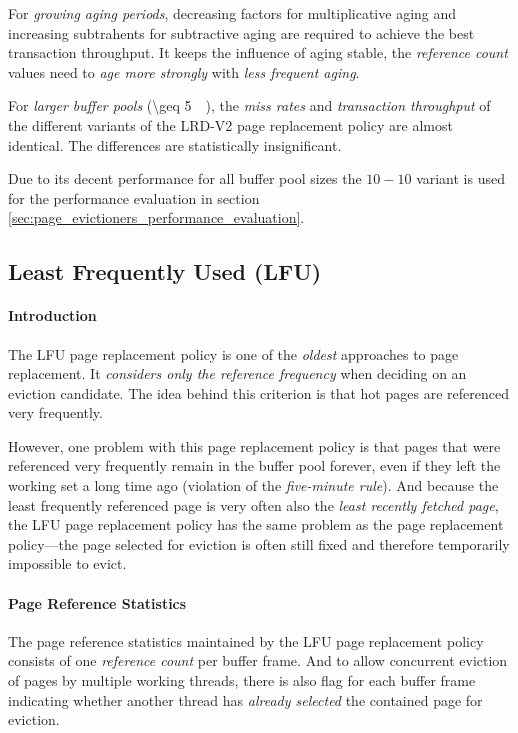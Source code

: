     For \emph{growing aging periods}, decreasing factors for multiplicative aging and increasing subtrahents for subtractive aging are required to achieve the best transaction throughput. It keeps the influence of aging stable, the \textit{reference count} values need to \emph{age more strongly} with \emph{less frequent aging}.

    For \emph{larger buffer pools} (\SI{\geq 5}{\giga\byte}), the \emph{miss rates} and \emph{transaction throughput} of the different variants of the LRD-V2 page replacement policy are almost identical. The differences are statistically insignificant.

    Due to its decent performance for all buffer pool sizes the $10 - 10$ variant is used for the performance evaluation in section \ref{sec:page_evictioners_performance_evaluation}.

\subsection[LFU]{Least Frequently Used (LFU)} \label{subsec:lfu}

\paragraph{Introduction}

    The LFU page replacement policy is one of the \emph{oldest} approaches to page replacement. It \emph{considers only the reference frequency} when deciding on an eviction candidate. The idea behind this criterion is that hot pages are referenced very frequently.

    However, one problem with this page replacement policy is that pages that were referenced very frequently remain in the buffer pool forever, even if they left the working set a long time ago (violation of the \emph{five-minute rule}). And because the least frequently referenced page is very often also the \emph{least recently fetched page}, the LFU page replacement policy has the same problem as the  page replacement policy---the page selected for eviction is often still fixed and therefore temporarily impossible to evict.
    
\paragraph{Page Reference Statistics}

    The page reference statistics maintained by the LFU page replacement policy consists of one \emph{reference count} per buffer frame. And to allow concurrent eviction of pages by multiple working threads, there is also flag for each buffer frame indicating whether another thread has \emph{already selected} the contained page for eviction.

